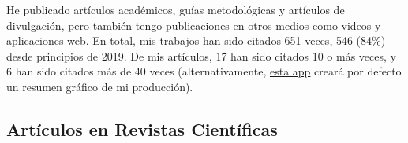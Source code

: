 \documentclass[11pt,a4paper,]{awesome-cv}
\begin{document}
\begin{footnotesize}
He publicado artículos académicos, guías metodológicas y artículos de divulgación, pero también tengo publicaciones en otros medios como videos y aplicaciones web. En total, mis trabajos han sido citados 651 veces, 546 (84\%) desde principios de 2019. De mis artículos, 17 han sido citados 10 o más veces, y 6 han sido citados más de 40 veces (alternativamente, \href{https://shiny.jdl-svr.lat/ScholarlyOutput_ES/}{esta app} creará por defecto un resumen gráfico de mi producción).
\end{footnotesize}

\hypertarget{artuxedculos-en-revistas-cientuxedficas}{%
\subsection{Artículos en Revistas
Científicas}\label{artuxedculos-en-revistas-cientuxedficas}}
\end{document}
